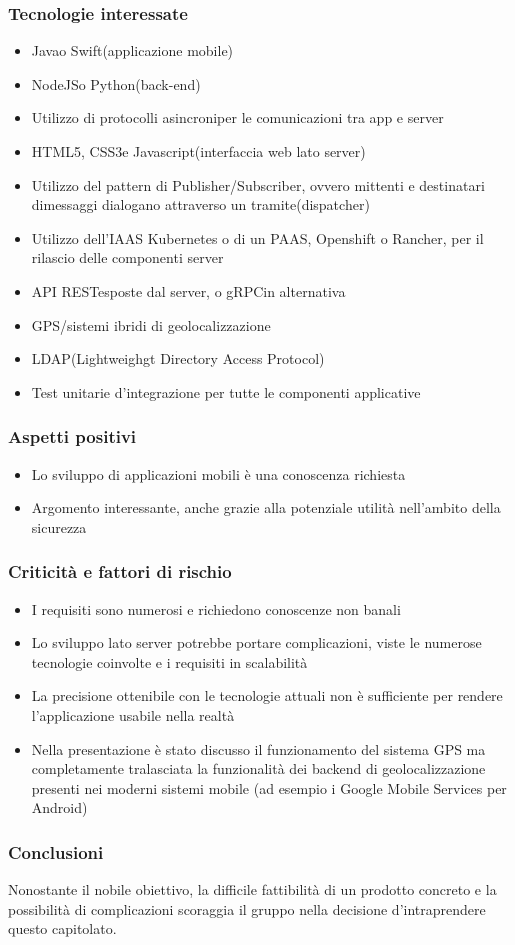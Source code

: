 \subsubsection{Tecnologie interessate}
\begin{itemize}
	\item Java\glo o Swift\glo (applicazione mobile)
	\item NodeJS\glo o Python\glo (back-end\glo)
	\item Utilizzo di protocolli asincroni\glosp per le comunicazioni tra app e server
	\item HTML5\glo, CSS3\glo e Javascript\glo (interfaccia web lato server)
	\item Utilizzo del pattern di Publisher/Subscriber\glo, ovvero mittenti e destinatari dimessaggi dialogano attraverso un tramite(dispatcher)
	\item Utilizzo dell’IAAS Kubernetes o di un PAAS, Openshift o Rancher, per il rilascio delle componenti server
	\item API REST\glosp esposte dal server, o gRPC\glo in alternativa
	\item GPS\glo/sistemi ibridi di geolocalizzazione
	\item LDAP\glo (Lightweighgt Directory Access Protocol)
	\item Test unitari\glosp e d'integrazione per tutte le componenti applicative
\end{itemize}

\subsubsection{Aspetti positivi}
\begin{itemize}
	\item Lo sviluppo di applicazioni mobili è una conoscenza richiesta
	\item Argomento interessante, anche grazie alla potenziale utilità nell'ambito della sicurezza
\end{itemize}

\subsubsection{Criticità e fattori di rischio}
\begin{itemize}
	\item I requisiti sono numerosi e richiedono conoscenze non banali
	\item Lo sviluppo lato server potrebbe portare complicazioni, viste le numerose tecnologie coinvolte e i requisiti in scalabilità
	\item La precisione ottenibile con le tecnologie attuali non è sufficiente per rendere l’applicazione usabile nella realtà
	\item Nella presentazione è stato discusso il funzionamento del sistema GPS ma completamente tralasciata la funzionalità dei backend di geolocalizzazione presenti nei moderni sistemi mobile (ad esempio i Google Mobile Services per Android)
\end{itemize}

\subsubsection{Conclusioni}
Nonostante il nobile obiettivo, la difficile fattibilità di un prodotto concreto e la possibilità di complicazioni scoraggia il gruppo nella decisione d'intraprendere questo capitolato.
